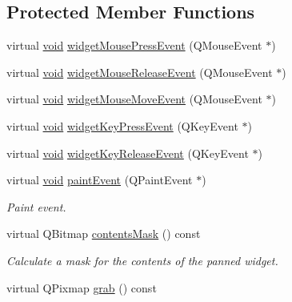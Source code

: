 \subsection*{Protected Member Functions}
\begin{DoxyCompactItemize}
\item 
virtual \hyperlink{group___u_a_v_objects_plugin_ga444cf2ff3f0ecbe028adce838d373f5c}{void} \hyperlink{class_qwt_panner_ae002958978dcc751f9edda24e5858dd9}{widget\-Mouse\-Press\-Event} (Q\-Mouse\-Event $\ast$)
\item 
virtual \hyperlink{group___u_a_v_objects_plugin_ga444cf2ff3f0ecbe028adce838d373f5c}{void} \hyperlink{class_qwt_panner_ab2da1e24b1456b223eaa826d8e0a3a81}{widget\-Mouse\-Release\-Event} (Q\-Mouse\-Event $\ast$)
\item 
virtual \hyperlink{group___u_a_v_objects_plugin_ga444cf2ff3f0ecbe028adce838d373f5c}{void} \hyperlink{class_qwt_panner_a6545bc6e25018253c59fc27a48eb948f}{widget\-Mouse\-Move\-Event} (Q\-Mouse\-Event $\ast$)
\item 
virtual \hyperlink{group___u_a_v_objects_plugin_ga444cf2ff3f0ecbe028adce838d373f5c}{void} \hyperlink{class_qwt_panner_a7ed4e89f6c52b841e20ad497af4b4ebc}{widget\-Key\-Press\-Event} (Q\-Key\-Event $\ast$)
\item 
virtual \hyperlink{group___u_a_v_objects_plugin_ga444cf2ff3f0ecbe028adce838d373f5c}{void} \hyperlink{class_qwt_panner_a8bd447df4a30299bbc8e6b6d3e2e2f9f}{widget\-Key\-Release\-Event} (Q\-Key\-Event $\ast$)
\item 
virtual \hyperlink{group___u_a_v_objects_plugin_ga444cf2ff3f0ecbe028adce838d373f5c}{void} \hyperlink{class_qwt_panner_acd76ea518bd9267a45115d2c6ce19353}{paint\-Event} (Q\-Paint\-Event $\ast$)
\begin{DoxyCompactList}\small\item\em Paint event. \end{DoxyCompactList}\item 
virtual Q\-Bitmap \hyperlink{class_qwt_panner_a665cd319422766cdf9cacb96498b0c22}{contents\-Mask} () const 
\begin{DoxyCompactList}\small\item\em Calculate a mask for the contents of the panned widget. \end{DoxyCompactList}\item 
virtual Q\-Pixmap \hyperlink{class_qwt_panner_ad854755a61d2cb9c9666889bdbbe9859}{grab} () const 
\end{DoxyCompactItemize}


